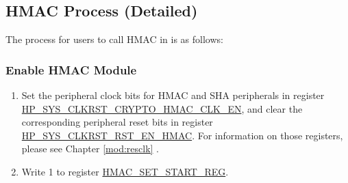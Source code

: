 \documentclass[main\_\_EN.tex]{subfiles}
\begin{document}

\subsection{HMAC Process (Detailed)}
\label{sec:hmac-process-detailed}
The process for users to call HMAC in \chipname{} is as follows:

\subsubsection{Enable HMAC Module}
\label{sec:hmac-enable-module}

    \begin{enumerate}
        \item Set the peripheral clock bits for HMAC and SHA peripherals in register \hyperref[fielddesc:HPSYSCLKRSTCRYPTOHMACCLKEN]{HP\_SYS\_CLKRST\_CRYPTO\_HMAC\_CLK\_EN}, and clear the corresponding peripheral reset bits in register \hyperref[fielddesc:HPSYSCLKRSTRSTENHMAC]{HP\_SYS\_CLKRST\_RST\_EN\_HMAC}. For information on those registers, please see Chapter \ref{mod:resclk} \textit{}.
        \item Write 1 to register \hyperref[regdesc:HMACSETSTARTREG]{HMAC\_SET\_START\_REG}.
    \end{enumerate}
\end{document}
